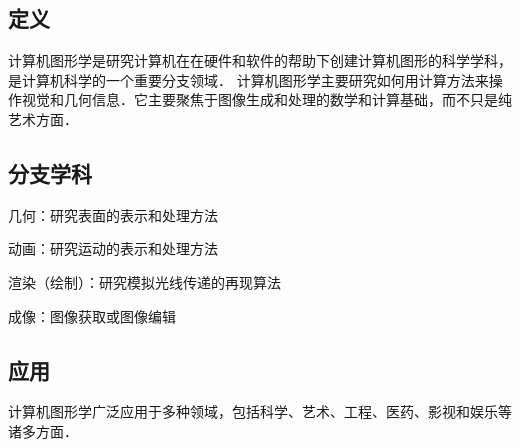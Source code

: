 
\subsection{定义}
计算机图形学是研究计算机在在硬件和软件的帮助下创建计算机图形的科学学科，是计算机科学的一个重要分支领域．
计算机图形学主要研究如何用计算方法来操作视觉和几何信息．它主要聚焦于图像生成和处理的数学和计算基础，而不只是纯艺术方面．

\subsection{分支学科}
几何：研究表面的表示和处理方法

动画：研究运动的表示和处理方法

渲染（绘制）：研究模拟光线传递的再现算法

成像：图像获取或图像编辑

\subsection{应用}
计算机图形学广泛应用于多种领域，包括科学、艺术、工程、医药、影视和娱乐等诸多方面．